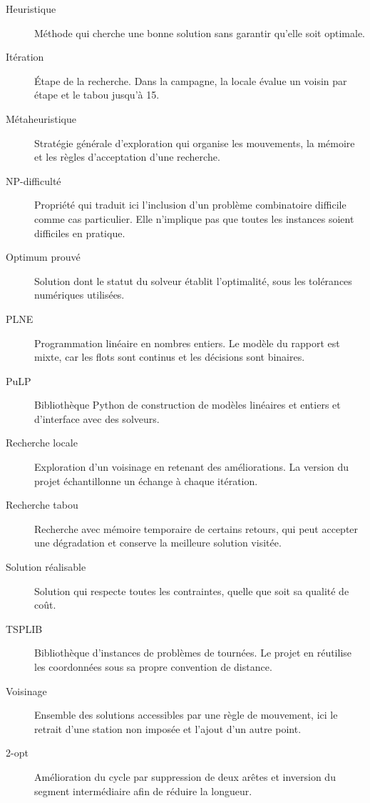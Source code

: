 \begin{description}
\item[Heuristique] Méthode qui cherche une bonne solution sans garantir
qu'elle soit optimale.
\item[Itération] Étape de la recherche. Dans la campagne, la locale évalue
un voisin par étape et le tabou jusqu'à 15.
\item[Métaheuristique] Stratégie générale d'exploration qui organise les
mouvements, la mémoire et les règles d'acceptation d'une recherche.
\item[NP-difficulté] Propriété qui traduit ici l'inclusion d'un problème
combinatoire difficile comme cas particulier. Elle n'implique pas que
toutes les instances soient difficiles en pratique.
\item[Optimum prouvé] Solution dont le statut du solveur établit l'optimalité,
sous les tolérances numériques utilisées.
\item[PLNE] Programmation linéaire en nombres entiers. Le modèle du rapport
est mixte, car les flots sont continus et les décisions sont binaires.
\item[PuLP] Bibliothèque Python de construction de modèles linéaires et
entiers et d'interface avec des solveurs.
\item[Recherche locale] Exploration d'un voisinage en retenant des améliorations.
La version du projet échantillonne un échange à chaque itération.
\item[Recherche tabou] Recherche avec mémoire temporaire de certains retours,
qui peut accepter une dégradation et conserve la meilleure solution visitée.
\item[Solution réalisable] Solution qui respecte toutes les contraintes,
quelle que soit sa qualité de coût.
\item[TSPLIB] Bibliothèque d'instances de problèmes de tournées. Le projet
en réutilise les coordonnées sous sa propre convention de distance.
\item[Voisinage] Ensemble des solutions accessibles par une règle de mouvement,
ici le retrait d'une station non imposée et l'ajout d'un autre point.
\item[2-opt] Amélioration du cycle par suppression de deux arêtes et inversion
du segment intermédiaire afin de réduire la longueur.
\end{description}
